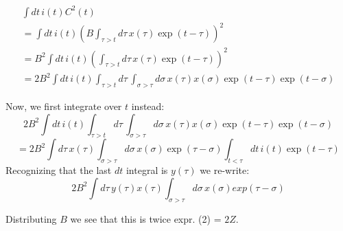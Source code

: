 \documentclass[12pt]{article}
\begin{document}
\begin{eqnarray}
\int{dt\, i(t) C^2(t)}
	\\ = \int{dt\, i(t) \left(
		B \int_{\tau>t}{d\tau\, x(\tau) \exp(t-\tau)}
	\right)^2}
	\\ = B^2 \int{dt\, i(t) \left(
		\int_{\tau>t}{d\tau\, x(\tau) \exp(t-\tau)}
	\right)^2}
	\\ =  2B^2 \int{dt\, i(t) \int_{\tau>t}{d\tau\, \int_{\sigma>\tau}{d\sigma\, x(\tau) x(\sigma) \exp(t-\tau)\exp(t-\sigma)}}}
\end{eqnarray}

Now, we first integrate over $t$ instead:
  $$ 2B^2 \int{dt\, i(t) \int_{\tau>t}{d\tau\, \int_{\sigma>\tau}{d\sigma\, x(\tau) x(\sigma) \exp(t-\tau)\exp(t-\sigma)}}}$$
  $$ = 2B^2 \int{d\tau\, x(\tau) \int_{\sigma > \tau}{d\sigma\, x(\sigma) \exp(\tau-\sigma)\int_{t<\tau}{dt\, i(t) \exp(t-\tau)}}}$$
Recognizing that the last $dt$ integral is $y(\tau)$ we re-write:
 $$ 2B^2 \int{d\tau\, y(\tau)x(\tau) \int_{\sigma>\tau}{d\sigma\, x(\sigma) exp(\tau-\sigma)}}$$

Distributing $B$ we see that this is twice expr. (2) = $2Z$.




%
\end{document}
